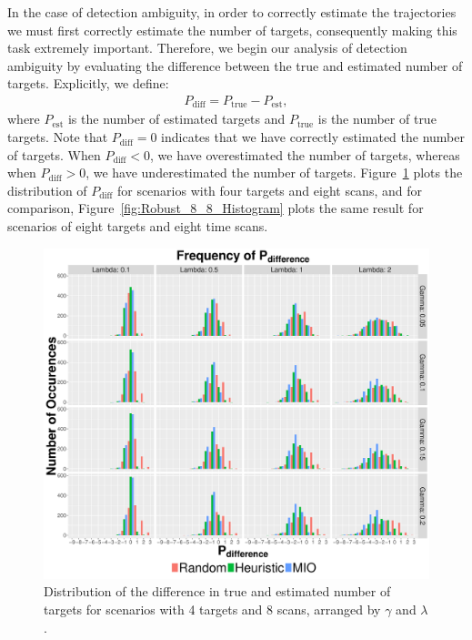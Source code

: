 In the case of detection ambiguity, in order to correctly estimate the trajectories we must first correctly estimate the number of targets, consequently making this task extremely important. Therefore, we begin our analysis of detection ambiguity by evaluating the difference between the true and estimated number of targets. Explicitly, we define:
\begin{align}
	P_{\text{diff}} = P_{\text{true}} - P_{\text{est}},
\end{align}
where $P_{\text{est}}$ is the number of estimated targets and $ P_{\text{true}}$ is the number of true targets. Note that $P_{\text{diff}} = 0$ indicates that we have correctly estimated the number of targets. When $P_{\text{diff}} < 0$, we have overestimated the number of targets, whereas when $P_{\text{diff}} > 0$, we have underestimated the number of targets. Figure~\ref{fig:Robust_4_8_Histogram} plots the distribution of $P_{\text{diff}}$ for scenarios with four targets and eight scans, and for comparison, Figure~\ref{fig:Robust_8_8_Histogram} plots the same result for scenarios of eight targets and eight time scans. 
\begin{figure}[ht]
  \centering
  \includegraphics[width=\columnwidth]{../Figures/4_8_Histogram}
  \caption{Distribution of the difference in true and estimated number of targets for scenarios with 4 targets and 8 scans, arranged by $\gamma$ and $\lambda$.}
  \label{fig:Robust_4_8_Histogram}
\end{figure}
